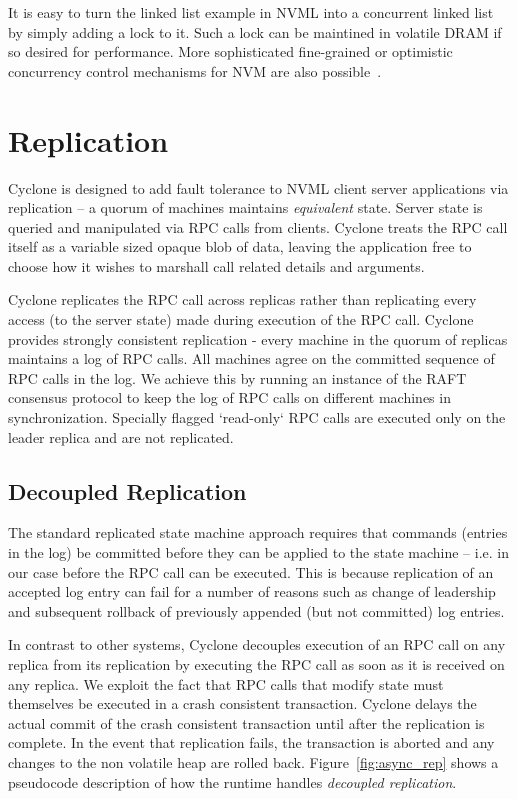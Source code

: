 \documentclass[10pt, preprint]{sigplanconf}
\begin{document}
It is easy to turn the linked list example in NVML into a concurrent linked list
by simply adding a lock to it. Such a lock can be maintined in volatile DRAM if
so desired for performance. More sophisticated fine-grained or optimistic
concurrency control mechanisms for NVM are also
possible~\cite{mnemosyne, cdds, nvheaps}.

\section{Replication}
Cyclone is designed to add fault tolerance to NVML client server applications
via replication -- a quorum of machines maintains \emph{equivalent} state.
Server state is queried and manipulated via RPC calls from clients.  Cyclone
treats the RPC call itself as a variable sized opaque blob of data, leaving the
application free to choose how it wishes to marshall call related details and
arguments.

Cyclone replicates the RPC call across replicas rather than replicating
every access (to the server state) made during execution of the RPC call.
Cyclone provides strongly consistent replication - every machine in the quorum
of replicas maintains a log of RPC calls.  All machines agree on the committed
sequence of RPC calls in the log. We achieve this by running an instance of the
RAFT~\cite{raft} consensus protocol to keep the log of RPC calls on different
machines in synchronization. Specially flagged `read-only` RPC calls are
executed only on the leader replica and are not replicated.

\subsection{Decoupled Replication}
\label{sec:decouple}
The standard replicated state machine approach requires that commands (entries
in the log) be committed before they can be applied to the state machine --
i.e. in our case before the RPC call can be executed. This is because
replication of an accepted log entry can fail for a
number of reasons such as change of leadership and subsequent
rollback of previously appended (but not committed) log entries.

In contrast to other systems, Cyclone decouples execution of an RPC call on any
replica from its replication by executing the RPC call as soon as it is received
on any replica. We exploit the fact that RPC calls that modify state must
themselves be executed in a crash consistent transaction. Cyclone delays the
actual commit of the crash consistent transaction until after the replication is
complete. In the event that replication fails, the transaction is aborted and
any changes to the non volatile heap are rolled back. Figure~\ref{fig:async_rep}
shows a pseudocode description of how the runtime handles \emph{decoupled
  replication}.
\end{document}
